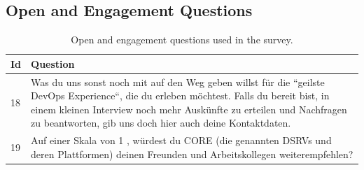 \documentclass[a4paper,10pt]{article}
\begin{document}
    \subsection{Open and Engagement Questions}
    \label{subsec:openandengagement}
    \begin{table}[!htbp]
        \begin{center}
            \begin{tabularx}{\textwidth}{lX}
                \toprule
                Id & Question                                                                                                                                                                                                                                                                      \\
                \midrule
                18 & Was du uns sonst noch mit auf den Weg geben willst für die ``geilste DevOps Experience``, die du erleben möchtest. Falls du bereit bist, in einem kleinen Interview noch mehr Auskünfte zu erteilen und Nachfragen zu beantworten, gib uns doch hier auch deine Kontaktdaten. \\
                19 & Auf einer Skala von 1 \- 10, würdest du CORE (die genannten DSRVs und deren Plattformen) deinen Freunden und Arbeitskollegen weiterempfehlen?                                                                                                                                 \\
                \bottomrule
            \end{tabularx}
        \end{center}
        \caption{\label{tab:oetable} Open and engagement questions used in the survey.}
    \end{table}
    \FloatBarrier
\end{document}
